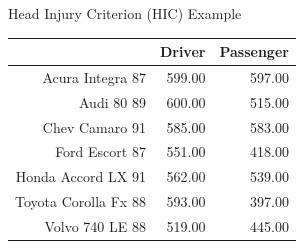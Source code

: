 \documentclass[14pt]{beamer}\usepackage[]{graphicx}\usepackage[]{color}
\begin{document}
\begin{frame}[fragile]{Head Injury Criterion (HIC) Example}

\begin{table}[ht]
\centering
\begin{tabular}{rrr}
  \hline
 & Driver & Passenger \\ 
  \hline
Acura Integra 87 & 599.00 & 597.00 \\ 
  Audi 80 89 & 600.00 & 515.00 \\ 
  Chev Camaro 91 & 585.00 & 583.00 \\ 
  Ford Escort 87 & 551.00 & 418.00 \\ 
  Honda Accord LX 91 & 562.00 & 539.00 \\ 
  Toyota Corolla Fx 88 & 593.00 & 397.00 \\ 
  Volvo 740 LE 88 & 519.00 & 445.00 \\ 
   \hline
\end{tabular}
\end{table}

\end{frame}
\end{document}
